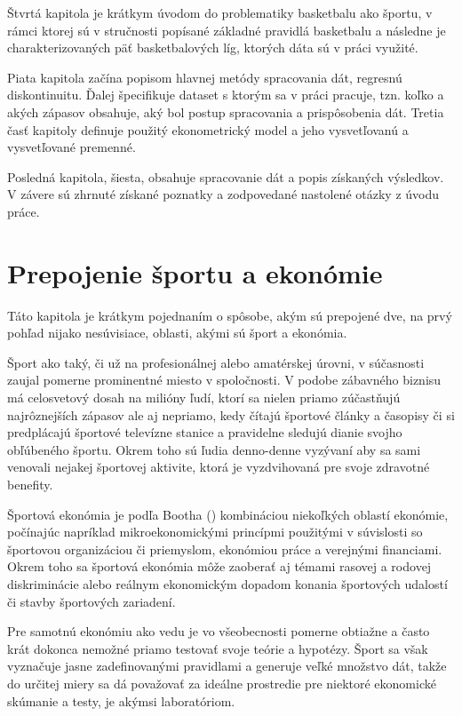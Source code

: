 \documentclass[
  digital, %
  oneside, %
  notable,   %
  lof,     %
  lot,     %
]{fithesis3}
\begin{document}
	Štvrtá kapitola je krátkym úvodom do problematiky basketbalu ako športu, v rámci ktorej sú v stručnosti popísané základné pravidlá basketbalu a následne je charakterizovaných päť basketbalových líg, ktorých dáta sú v práci využité.
	
	Piata kapitola začína popisom hlavnej metódy spracovania dát, regresnú diskontinuitu. Ďalej špecifikuje dataset s ktorým sa v práci pracuje, tzn. koľko a akých zápasov obsahuje, aký bol postup spracovania a prispôsobenia dát. Tretia časť kapitoly definuje použitý ekonometrický model a jeho vysvetľovanú a vysvetľované premenné.
	
	Posledná kapitola, šiesta, obsahuje spracovanie dát a popis získaných výsledkov. V závere sú zhrnuté získané poznatky a zodpovedané nastolené otázky z úvodu práce.
	

	\chapter{Prepojenie športu a ekonómie}
	Táto kapitola je krátkym pojednaním o spôsobe, akým sú prepojené dve, na prvý pohľad nijako nesúvisiace, oblasti, akými sú šport a ekonómia.
	
	Šport ako taký, či už na profesionálnej alebo amatérskej úrovni, v súčasnosti zaujal pomerne prominentné miesto v spoločnosti. V podobe zábavného biznisu má celosvetový dosah na milióny ľudí, ktorí sa nielen priamo zúčastňujú najrôznejších zápasov ale aj nepriamo, kedy čítajú športové články a časopisy či si predplácajú športové televízne stanice a pravidelne sledujú dianie svojho obľúbeného športu. \parencite{conrad2011} Okrem toho sú ľudia denno-denne vyzývaní aby sa sami venovali nejakej športovej aktivite, ktorá je vyzdvihovaná pre svoje zdravotné benefity.
	
	Športová ekonómia je podľa Bootha (\citeyear{booth2009}) kombináciou niekoľkých oblastí ekonómie, počínajúc napríklad mikroekonomickými princípmi použitými v súvislosti so športovou organizáciou či priemyslom, ekonómiou práce a verejnými financiami. Okrem toho sa športová ekonómia môže zaoberať aj témami rasovej a rodovej diskriminácie alebo reálnym ekonomickým dopadom konania športových udalostí či stavby športových zariadení. 
	
	Pre samotnú ekonómiu ako vedu je vo všeobecnosti pomerne obtiažne a často krát dokonca nemožné  priamo testovať svoje teórie a hypotézy. Šport sa však vyznačuje jasne zadefinovanými pravidlami a generuje veľké množstvo dát, takže do určitej miery sa dá považovať za ideálne prostredie pre niektoré ekonomické skúmanie a testy, je akýmsi laboratóriom.
	
\end{document}
